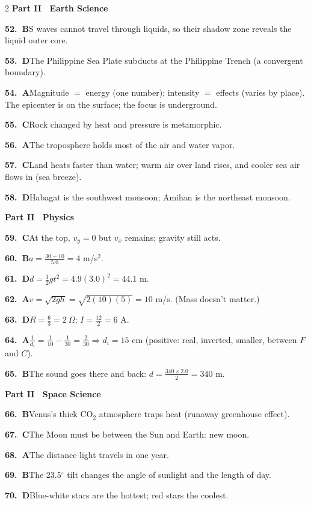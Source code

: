 \documentclass[10pt]{article}
\newcommand{\ans}[3]{\par\noindent\textbf{#1.~\textcolor{dblue}{#2}}\enspace #3}
\begin{document}
\begin{multicols}{2}
{\sffamily\bfseries\color{dblue}Part II \textbullet\ Earth Science}
\ans{52}{B}{S waves cannot travel through liquids, so their shadow zone reveals the liquid outer core.}
\ans{53}{D}{The Philippine Sea Plate subducts at the Philippine Trench (a convergent boundary).}
\ans{54}{A}{Magnitude $=$ energy (one number); intensity $=$ effects (varies by place). The epicenter is on the surface; the focus is underground.}
\ans{55}{C}{Rock changed by heat and pressure is metamorphic.}
\ans{56}{A}{The troposphere holds most of the air and water vapor.}
\ans{57}{C}{Land heats faster than water; warm air over land rises, and cooler sea air flows in (sea breeze).}
\ans{58}{D}{Habagat is the southwest monsoon; Amihan is the northeast monsoon.}

{\sffamily\bfseries\color{dblue}Part II \textbullet\ Physics}
\ans{59}{C}{At the top, $v_y=0$ but $v_x$ remains; gravity still acts.}
\ans{60}{B}{$a=\frac{30-10}{5.0}=4$ m/s$^2$.}
\ans{61}{D}{$d=\frac12gt^2=4.9(3.0)^2=44.1$ m.}
\ans{62}{A}{$v=\sqrt{2gh}=\sqrt{2(10)(5)}=10$ m/s. (Mass doesn't matter.)}
\ans{63}{D}{$R=\frac63=2\ \Omega$; $I=\frac{12}{2}=6$ A.}
\ans{64}{A}{$\frac1{d_i}=\frac1{10}-\frac1{30}=\frac2{30}\Rightarrow d_i=15$ cm (positive: real, inverted, smaller, between $F$ and $C$).}
\ans{65}{B}{The sound goes there and back: $d=\frac{340\times2.0}{2}=340$ m.}

{\sffamily\bfseries\color{dblue}Part II \textbullet\ Space Science}
\ans{66}{B}{Venus's thick CO$_2$ atmosphere traps heat (runaway greenhouse effect).}
\ans{67}{C}{The Moon must be between the Sun and Earth: new moon.}
\ans{68}{A}{The distance light travels in one year.}
\ans{69}{B}{The 23.5$^\circ$ tilt changes the angle of sunlight and the length of day.}
\ans{70}{D}{Blue-white stars are the hottest; red stars the coolest.}


\end{multicols}
\end{document}
